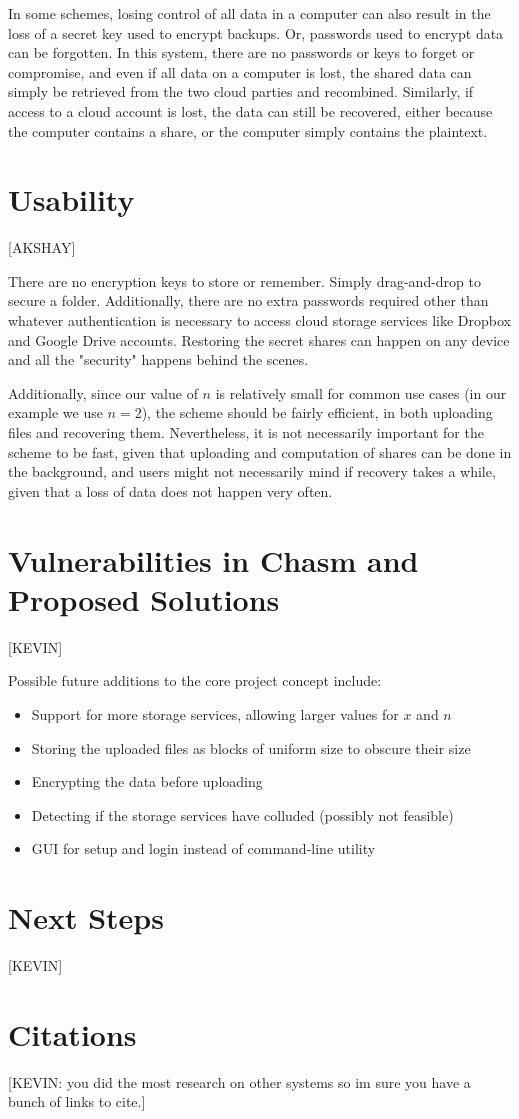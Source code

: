 \documentclass[letterpaper,twocolumn,10pt]{article}
\begin{document}
In some schemes, losing control of all data in a computer can also result in the loss of a secret key used to encrypt backups. Or, passwords used to encrypt data can be forgotten. In this system, there are no passwords or keys to forget or compromise, and even if all data on a computer is lost, the shared data can simply be retrieved from the two cloud parties and recombined. Similarly, if access to a cloud account is lost, the data can still be recovered, either because the computer contains a share, or the computer simply contains the plaintext.

\section{Usability}
[AKSHAY]

There are no encryption keys to store or remember. Simply drag-and-drop to secure a folder. Additionally, there are no extra passwords required other than whatever authentication is necessary to access cloud storage services like Dropbox and Google Drive accounts. Restoring the secret shares can happen on any device and all the "security" happens behind the scenes.

Additionally, since our value of $n$ is relatively small for common use cases (in our example we use $n=2$), the scheme should be fairly efficient, in both uploading files and recovering them. Nevertheless, it is not necessarily important for the scheme to be fast, given that uploading and computation of shares can be done in the background, and users might not necessarily mind if recovery takes a while, given that a loss of data does not happen very often.


\section{Vulnerabilities in Chasm and Proposed Solutions}
[KEVIN]

Possible future additions to the core project concept include:

\begin{itemize}
	\item Support for more storage services, allowing larger values for $x$ and $n$
    \item Storing the uploaded files as blocks of uniform size to obscure their size
    \item Encrypting the data before uploading
    \item Detecting if the storage services have colluded (possibly not feasible)
    \item GUI for setup and login instead of command-line utility
\end{itemize}
\section{ Next Steps}
[KEVIN]
\section{Citations}
[KEVIN: you did the most research on other systems so im sure you have a bunch of links to cite.]
\end{document}

